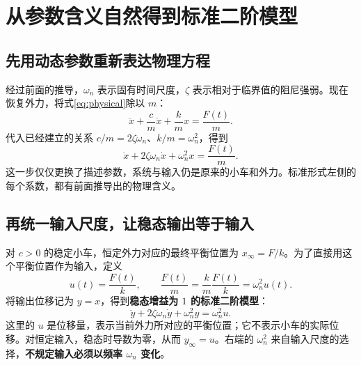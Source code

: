 \documentclass[UTF8,a4paper,11pt,fontset=windows]{ctexart}
\begin{document}
\newpage
\section{从参数含义自然得到标准二阶模型}

\subsection{先用动态参数重新表达物理方程}
经过前面的推导，$\omega_n$ 表示固有时间尺度，$\zeta$ 表示相对于临界值的阻尼强弱。现在恢复外力，将式\eqref{eq:physical}除以 $m$：
\[
  \ddot x+\frac{c}{m}\dot x+\frac{k}{m}x=\frac{F(t)}{m}.
\]
代入已经建立的关系 $c/m=2\zeta\omega_n$、$k/m=\omega_n^2$，得到
\begin{equation}\label{eq:force}
  \boxed{\ddot x+2\zeta\omega_n\dot x+\omega_n^2x=\frac{F(t)}{m}.}
\end{equation}
这一步仅仅更换了描述参数，系统与输入仍是原来的小车和外力。标准形式左侧的每个系数，都有前面推导出的物理含义。

\subsection{再统一输入尺度，让稳态输出等于输入}
对 $c>0$ 的稳定小车，恒定外力对应的最终平衡位置为 $x_\infty=F/k$。为了直接用这个平衡位置作为输入，定义
\[
  u(t)=\frac{F(t)}{k},\qquad
  \frac{F(t)}{m}=\frac{k}{m}\frac{F(t)}{k}=\omega_n^2u(t).
\]
将输出位移记为 $y=x$，得到\textbf{稳态增益为 $1$ 的标准二阶模型}：
\begin{equation}\label{eq:standard}
  \boxed{\ddot y+2\zeta\omega_n\dot y+\omega_n^2y=\omega_n^2u.}
\end{equation}
这里的 $u$ 是位移量，表示当前外力所对应的平衡位置；它不表示小车的实际位移。对恒定输入，稳态时导数为零，从而 $y_\infty=u$。右端的 $\omega_n^2$ 来自输入尺度的选择，\textbf{不规定输入必须以频率 $\omega_n$ 变化}。
\end{document}
